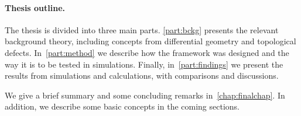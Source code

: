 









\paragraph{Thesis outline.} %
{%
The thesis is divided into three main parts. %
\cref{part:bckg} presents the relevant background theory, including concepts from differential geometry and topological defects. %
In~\cref{part:method} we describe how the framework was designed and the way it is to be tested in simulations. %
Finally, in~\cref{part:findings} we present the results from simulations and calculations, with comparisons and discussions. %

We give a brief summary and some concluding remarks in~\cref{chap:finalchap}. In addition, we describe some basic concepts in the coming sections. 
}










